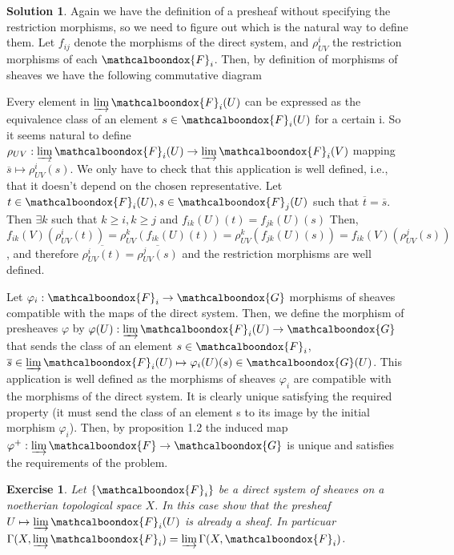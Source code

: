 \documentclass[12pt]{article}
\newtheorem{ex}{Exercise}[section]
\theoremstyle{definition}
\newtheorem*{sol}{Solution}
\newcommand{\sF}{\ensuremath{\mathcalboondox{F}}}
\newcommand{\sG}{\ensuremath{\mathcalboondox{G}}}
\begin{document}
\begin{sol}
	Again we have the definition of a presheaf without specifying the restriction morphisms, so we need to figure out which is the natural way to define them. Let $f_{ij}$ denote the morphisms of the direct system, and $\rho^i_{UV}$ the restriction morphisms of each $\sF_i$. Then, by definition of morphisms of sheaves we have the following commutative diagram

	Every element in $\varinjlim \sF_i(U)$ can be expressed as the equivalence class of an element $s \in \sF_i(U)$ for a certain i. So it seems natural to define $\rho_{UV}: \varinjlim \sF_i(U) \to \varinjlim \sF_i(V)$ mapping $\overline{s} \mapsto \overline{\rho^i_{UV}(s)}$. We only have to check that this application is well defined, i.e., that it doesn't depend on the chosen representative. Let $t \in \sF_i(U), s \in \sF_j(U)$ such that $\overline{t} = \overline{s}$. Then $\exists k$ such that $k \geq i, k \geq j$ and $f_{ik}(U)(t) = f_{jk}(U)(s)$ Then, $f_{ik}(V)(\rho_{UV}^i(t)) = \rho^k_{UV}(f_{ik}(U)(t)) = \rho_{UV}^k(f_{jk}(U)(s)) = f_{ik}(V)(\rho^j_{UV}(s))$, and therefore $\overline{\rho^i_{UV}(t)} = \overline{\rho^j_{UV}(s)}$ and the restriction morphisms are well defined.

	Let $\varphi_i: \sF_i \to \sG$ morphisms of sheaves compatible with the maps of the direct system. Then, we define the morphism of presheaves $\varphi$ by $\varphi(U): \varinjlim \sF_i(U) \to \sG$ that sends the class of an element $s \in \sF_i$, $\overline{s} \in \varinjlim \sF_i(U) \mapsto \varphi_i(U)(s) \in \sG(U)$. This application is well defined as the morphisms of sheaves $\varphi_i$ are compatible with the morphisms of the direct system. It is clearly unique satisfying the required property (it must send the class of an element s to its image by the initial morphism $\varphi_i$). Then, by proposition 1.2 the induced map $\varphi^{+}: \varinjlim \sF \to \sG$ is unique and satisfies the requirements of the problem.
\end{sol}

\begin{ex}
	Let $\{\sF_i\}$ be a direct system of sheaves on a noetherian topological space $X$. In this case show that the presheaf $U \mapsto \varinjlim \sF_i(U)$ is already a sheaf. In particuar $\Gamma(X, \varinjlim \sF_i) = \varinjlim \Gamma(X,\sF_i)$.
\end{ex}
\end{document}
